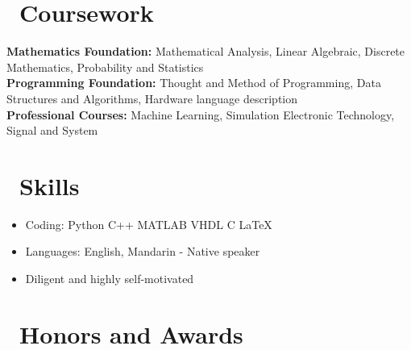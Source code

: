 \documentclass{resume}
\begin{document}



\section{\faBook\ Coursework}
\textbf{Mathematics Foundation: }Mathematical Analysis, Linear Algebraic, Discrete Mathematics, Probability and Statistics\\
\textbf{Programming Foundation: }Thought and Method of Programming, Data Structures and Algorithms, Hardware language description\\
\textbf{Professional Courses: }Machine Learning, Simulation Electronic Technology, Signal and System


\section{\faCogs\ Skills}
\begin{itemize}[parsep=0.5ex]
  \item Coding: Python C++ MATLAB VHDL C LaTeX 
  \item Languages: English, Mandarin - Native speaker
  \item Diligent and highly self-motivated
\end{itemize}

\section{\faInfo\ Honors and Awards}
\end{document}
